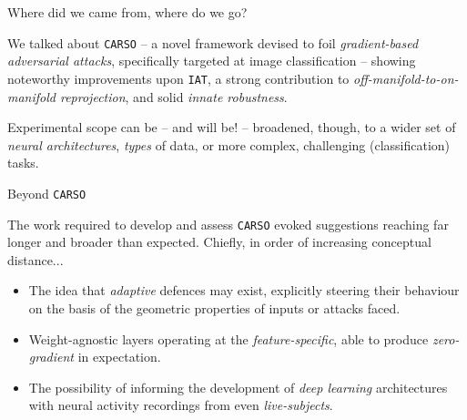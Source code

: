 \begin{frame}{ Where did we came from, where do we go?}

    We talked about \texttt{CARSO} -- a novel framework devised to foil \textit{gradient-based adversarial attacks}, specifically targeted at image classification -- showing noteworthy improvements upon \texttt{IAT}, a strong contribution to \textit{off-manifold-to-on-manifold reprojection}, and solid \textit{innate robustness}.

    Experimental scope can be -- and will be! -- broadened, though, to a wider set of \textit{neural architectures}, \textit{types} of data, or more complex, challenging (classification) tasks.

\end{frame}

\begin{frame}{ Beyond \texttt{CARSO}}

    The work required to develop and assess \texttt{CARSO} evoked suggestions reaching far longer and broader than expected. Chiefly, in order of increasing conceptual distance...

    \begin{itemize}
        \item The idea that \textit{adaptive} defences may exist, explicitly steering their behaviour on the basis of the geometric properties of inputs or attacks faced.
        \item Weight-agnostic layers operating at the \textit{feature-specific}, able to produce \textit{zero-gradient} in expectation.
        \item The possibility of informing the development of \textit{deep learning} architectures with neural activity recordings from even \textit{live-subjects}. 
    \end{itemize}
\end{frame}
